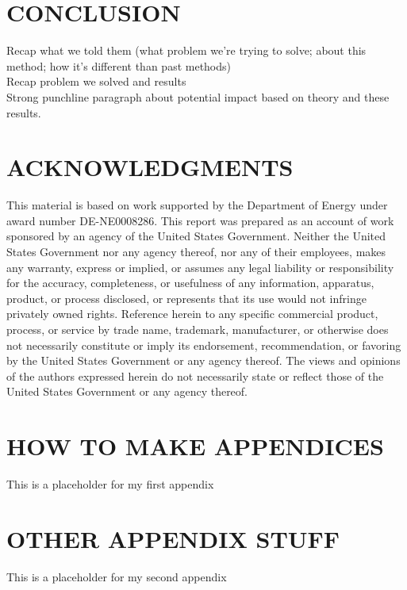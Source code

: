 \documentclass[12pt]{article}
\begin{document}
%
\section{CONCLUSION} 
\label{sect::conclusion}

Recap what we told them (what problem we're trying to solve; about this method; how it's different than past methods)\\
Recap problem we solved and results\\
Strong punchline paragraph about potential impact based on theory and these results.

%
\section*{ACKNOWLEDGMENTS}

This material is based on work supported by the Department of Energy under award number DE-NE0008286. This report was prepared as an account of work sponsored by an agency of the United States Government. Neither the United States Government nor any agency thereof, nor any of their employees, makes any warranty, express or implied, or assumes any legal liability or responsibility for the accuracy, completeness, or usefulness of any information, apparatus, product, or process disclosed, or represents that its use would not infringe privately owned rights. Reference herein to any specific commercial product, process, or service by trade name, trademark, manufacturer, or otherwise does not necessarily constitute or imply its endorsement, recommendation, or favoring by the United States Government or any agency thereof. The views and opinions of the authors expressed herein do not necessarily state or reflect those of the United States Government or any agency thereof.




\appendix

\makeatletter
\def\@seccntformat#1{APPENDIX \csname the#1\endcsname.~}
\makeatother

\section{HOW TO MAKE APPENDICES}
\label{app::a}

This is a placeholder for my first appendix

\section{OTHER APPENDIX STUFF}
\label{app::b}

This is a placeholder for my second appendix
\end{document}
